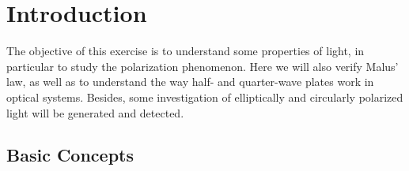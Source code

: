 \documentclass[a4paper]{article}
\begin{document}


\newpage
\tableofcontents
\setcounter{page}{1}

\newpage
\listoffigures
\listoftables

\newpage
\section{Introduction}
The objective of this exercise is to understand some properties of light, in particular to study the polarization phenomenon.
Here we will also verify Malus’ law, as well as to understand the way half- and quarter-wave plates work in optical systems.
Besides, some investigation of elliptically and circularly polarized light will be generated and detected.

\subsection{Basic Concepts}
\end{document}
